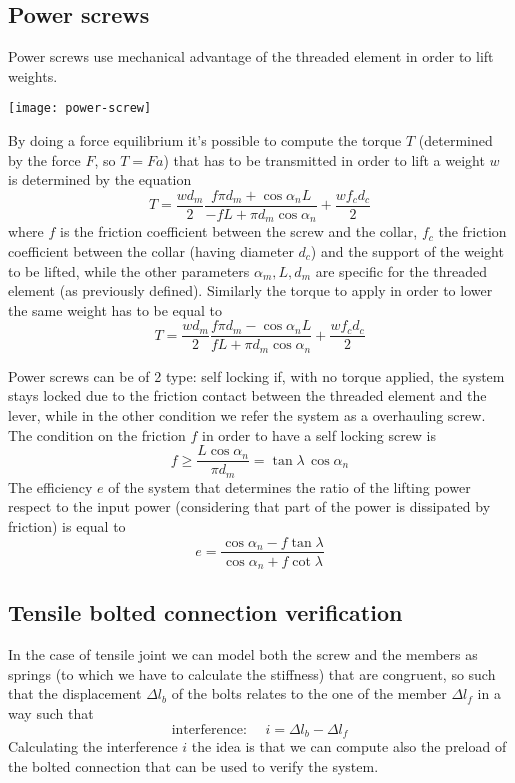 \begin{multicols}{2}
\subsection{Power screws}
	Power screws use mechanical advantage of the threaded element in order to lift weights.
	\begin{center}
		\texttt{[image: power-screw]}
	\end{center}
	By doing a force equilibrium it's possible to compute the torque $T$ (determined by the force $F$, so $T=Fa$) that has to be transmitted in order to lift a weight $w$ is determined by the equation
	\begin{equation}
		T = \frac{w d_m}{2} \frac{f\pi d_m + \cos\alpha_n L}{-fL + \pi d_m \cos\alpha_n} + \frac{wf_cd_c}{2}
	\end{equation}
	where $f$ is the friction coefficient between the screw and the collar, $f_c$ the friction coefficient between the collar (having diameter $d_c$) and the support of the weight to be lifted, while the other parameters $\alpha_m,L,d_m$ are specific for the threaded element (as previously defined). Similarly the torque to apply in order to lower the same weight has to be equal to
	\[ T = \frac{w d_m}{2} \frac{f\pi d_m - \cos\alpha_n L}{fL + \pi d_m \cos\alpha_n} + \frac{wf_cd_c}{2} \]
	
	Power screws can be of 2 type: self locking if, with no torque applied, the system stays locked due to the friction contact between the threaded element and the lever, while in the other condition we refer the system as a overhauling screw. The condition on the friction $f$ in order to have a self locking screw is
	\[ f \geq \frac{L\cos\alpha_n}{\pi d_m} = \tan\lambda \, \cos\alpha_n \]
	The efficiency $e$ of the system that determines the ratio of the lifting power respect to the input power (considering that part of the power is dissipated by friction) is equal to
	\[ e= \frac{\cos\alpha_n - f\tan\lambda}{\cos\alpha_n + f\cot \lambda } \]
	
\subsection{Tensile bolted connection verification}
	In the case of tensile joint we can model both the screw and the members as springs (to which we have to calculate the stiffness) that are congruent, so such that the displacement $\Delta l_b$ of the bolts relates to the one of the member $\Delta l_f$ in a way such that
	\[ \textrm{interference:  } \quad i = \Delta l_b - \Delta l_f	\]
	Calculating the interference $i$ the idea is that we can compute also the preload of the bolted connection that can be used to verify the system.
	

\end{multicols}

